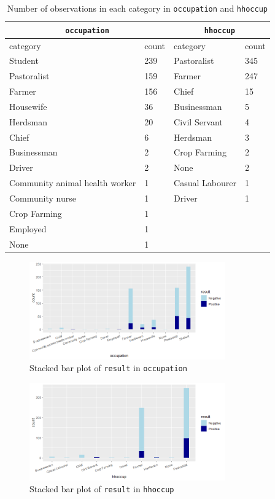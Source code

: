\documentclass[11pt,twoside]{article}
\numberwithin{Theorem}{section}
\numberwithin{Definition}{section}
\numberwithin{Lemma}{section}
\numberwithin{Algorithm}{section}
\numberwithin{equation}{section}
\begin{document}
\begin{table}[!h]
	\centering
	\begin{tabular}{|l|l|l|l|}
		\hline
		\multicolumn{2}{|c|}{\texttt{occupation}} & \multicolumn{2}{|c|}{\texttt{hhoccup}} \\
		\hline
		category & 	count & category & count \\
		\hline
		Student & 239 & Pastoralist & 345 \\				
		Pastoralist & 159 & Farmer & 247 \\
		Farmer & 156 & Chief & 15 \\
		Housewife & 36	& Businessman & 5 \\			
		Herdsman & 20 & Civil Servant & 4 \\	
		Chief & 6 & Herdsman & 3 \\	
		Businessman & 2 & Crop Farming & 2 \\
		Driver & 2 & None & 2 \\
		Community animal health worker & 1 & Casual Labourer & 1 \\			
		Community nurse & 1	& Driver & 1 \\	
		Crop Farming & 1 & & \\			
		Employed & 1 & & \\
		None & 1 & & \\
		\hline
	\end{tabular}	
	\caption{Number of observations in each category in \texttt{occupation} and \texttt{hhoccup}}
	\label{tab:occ}
\end{table}

\begin{figure}[!h]
	\centering
	\includegraphics[width = 0.75\textwidth]{Images/occupation_3.png}
	\caption{Stacked bar plot of \texttt{result} in \texttt{occupation}}
	\label{fig:occ5}
\end{figure}

\begin{figure}[!h]
	\centering
	\includegraphics[width = 0.75\textwidth]{Images/hhoccup.png}
	\caption{Stacked bar plot of \texttt{result} in \texttt{hhoccup}}
	\label{fig:hhoccup}
\end{figure}
\end{document}
